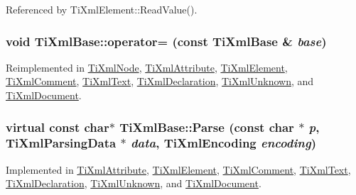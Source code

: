Referenced by TiXmlElement::ReadValue().\hypertarget{class_ti_xml_base_a183315aa6f1bb36d509b179e912cb93f}{
\subsubsection[{operator=}]{\setlength{\rightskip}{0pt plus 5cm}void TiXmlBase::operator= (const {\bf TiXmlBase} \& {\em base})}}
\label{class_ti_xml_base_a183315aa6f1bb36d509b179e912cb93f}


Reimplemented in \hyperlink{class_ti_xml_node_a9eb62a8d95b8a98ec2df481cc9e5a7e2}{TiXmlNode}, \hyperlink{class_ti_xml_attribute_a83b9c2a47dbfadf5029f2c0f13c18466}{TiXmlAttribute}, \hyperlink{class_ti_xml_element_af5cd4156e082ef3bf23adfe0ed173340}{TiXmlElement}, \hyperlink{class_ti_xml_comment_a46373f99b65cb960637dccb1f126bd49}{TiXmlComment}, \hyperlink{class_ti_xml_text_af5f15d40d048cea7cab9d0eb4fd8a7d2}{TiXmlText}, \hyperlink{class_ti_xml_declaration_a0fedc57539af9049be8db2d7d9d9ba33}{TiXmlDeclaration}, \hyperlink{class_ti_xml_unknown_a5097fe228cd5ad4edcdddf02c334fd83}{TiXmlUnknown}, and \hyperlink{class_ti_xml_document_aafbfacc3414008f619b1345775ef12a4}{TiXmlDocument}.\hypertarget{class_ti_xml_base_a00e4edb0219d00a1379c856e5a1d2025}{
\subsubsection[{Parse}]{\setlength{\rightskip}{0pt plus 5cm}virtual const char$\ast$ TiXmlBase::Parse (const char $\ast$ {\em p}, \/  {\bf TiXmlParsingData} $\ast$ {\em data}, \/  {\bf TiXmlEncoding} {\em encoding})}}
\label{class_ti_xml_base_a00e4edb0219d00a1379c856e5a1d2025}


Implemented in \hyperlink{class_ti_xml_attribute_ad62774421b814894b995af3b5d231dda}{TiXmlAttribute}, \hyperlink{class_ti_xml_element_af95c9165159fd9dfdcc5b894a3fcf85b}{TiXmlElement}, \hyperlink{class_ti_xml_comment_a43bddc18ac057734b41d84653b71d3e0}{TiXmlComment}, \hyperlink{class_ti_xml_text_a8d2dcfa41fc73d3e62dacc2fcf633819}{TiXmlText}, \hyperlink{class_ti_xml_declaration_a9839ea97ed687a2b7342fd7b0f04361b}{TiXmlDeclaration}, \hyperlink{class_ti_xml_unknown_aa51c2694e4177b5f0b5429ee5a81b58d}{TiXmlUnknown}, and \hyperlink{class_ti_xml_document_a789ad2f06f93d52bdb5570b2f3670289}{TiXmlDocument}.

